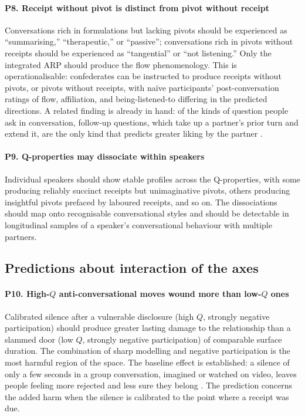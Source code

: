 \paragraph{P8. Receipt without pivot is distinct from pivot without receipt} Conversations rich in formulations but lacking pivots should be experienced as ``summarising,'' ``therapeutic,'' or ``passive''; conversations rich in pivots without receipts should be experienced as ``tangential'' or ``not listening.'' Only the integrated ARP should produce the flow phenomenology. This is operationalisable: confederates can be instructed to produce receipts without pivots, or pivots without receipts, with naïve participants' post-conversation ratings of flow, affiliation, and being-listened-to differing in the predicted directions. A related finding is already in hand: of the kinds of question people ask in conversation, follow-up questions, which take up a partner's prior turn and extend it, are the only kind that predicts greater liking by the partner \citep{Huang2017}.

\paragraph{P9. Q-properties may dissociate within speakers} Individual speakers should show stable profiles across the Q-properties, with some producing reliably succinct receipts but unimaginative pivots, others producing insightful pivots prefaced by laboured receipts, and so on. The dissociations should map onto recognisable conversational styles and should be detectable in longitudinal samples of a speaker's conversational behaviour with multiple partners.

\subsection{Predictions about interaction of the axes}

\paragraph{P10. High-$Q$ anti-conversational moves wound more than low-$Q$ ones} Calibrated silence after a vulnerable disclosure (high $Q$, strongly negative participation) should produce greater lasting damage to the relationship than a slammed door (low $Q$, strongly negative participation) of comparable surface duration. The combination of sharp modelling and negative participation is the most harmful region of the space. The baseline effect is established: a silence of only a few seconds in a group conversation, imagined or watched on video, leaves people feeling more rejected and less sure they belong \citep{Koudenburg2011}. The prediction concerns the added harm when the silence is calibrated to the point where a receipt was due.

